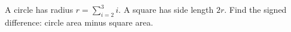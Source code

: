 A circle has radius $r=\sum_{i=2}^3 i$. A square has side length $2r$. Find the signed difference: circle area minus square area.
